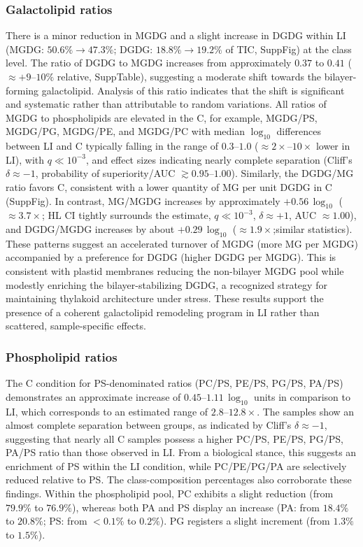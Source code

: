 \documentclass[10pt,letterpaper]{article}
\begin{document}
\begin{itemize}
\subsubsection*{Galactolipid ratios} 
There is a minor reduction in MGDG and a slight increase in DGDG within LI (MGDG: $50.6\% \rightarrow 47.3\%$; DGDG: $18.8\% \rightarrow 19.2\%$ of TIC, SuppFig) at the class level. The ratio of DGDG to MGDG increases from approximately $0.37$ to $0.41$ ($\approx +9$--$10\%$ relative, SuppTable), suggesting a moderate shift towards the bilayer-forming galactolipid. Analysis of this ratio indicates that the shift is significant and systematic rather than attributable to random variations. All ratios of MGDG to phospholipids are elevated in the C, for example, MGDG/PS, MGDG/PG, MGDG/PE, and  MGDG/PC with median $\log_{10}$ differences between LI and C typically falling in the range of $0.3$–$1.0$ ($\approx 2\times$–$10\times$ lower in LI), with $q \ll 10^{-3}$, and effect sizes indicating nearly complete separation (Cliff’s $\delta \approx -1$, probability of superiority/AUC $\gtrsim 0.95$–$1.00$). Similarly, the DGDG/MG ratio favors C, consistent with a lower quantity of MG per unit DGDG in C (SuppFig). In contrast, MG/MGDG increases by approximately $+0.56 \,\log_{10}$ ($\approx 3.7\times$; HL CI tightly surrounds the estimate, $q \ll 10^{-3}$, $\delta \approx +1$, AUC $\approx 1.00$), and DGDG/MGDG increases by about $+0.29 \,\log_{10}$ ($\approx 1.9\times$;similar statistics). These patterns suggest an accelerated turnover of MGDG (more MG per MGDG) accompanied by a preference for DGDG (higher DGDG per MGDG). This is consistent with plastid membranes reducing the non-bilayer MGDG pool while modestly enriching the bilayer-stabilizing DGDG, a recognized strategy for maintaining thylakoid architecture under stress. These results support the presence of a coherent galactolipid remodeling program in LI rather than scattered, sample-specific effects.


\subsubsection*{Phospholipid ratios}
The C condition for PS-denominated ratios (PC/PS, PE/PS, PG/PS, PA/PS) demonstrates an approximate increase of $0.45$–$1.11 \,\log_{10}$ units in comparison to LI, which corresponds to an estimated range of $2.8$–$12.8\times$. The samples show an almost complete separation between groups, as indicated by Cliff’s $\delta \approx -1$, suggesting that nearly all C samples possess a higher PC/PS, PE/PS, PG/PS, PA/PS ratio than those observed in LI. From a biological stance, this suggests an enrichment of PS within the LI condition, 
while PC/PE/PG/PA are selectively reduced relative to PS. The class-composition percentages also corroborate these findings. Within the phospholipid pool, PC exhibits a slight reduction (from $79.9\%$ to $76.9\%$), whereas both PA and PS display an increase (PA: from $18.4\%$ to $20.8\%$; PS: from $<0.1\%$ to $0.2\%$). PG registers a slight increment (from $1.3\%$ to $1.5\%$). 


\end{itemize}
\end{document}
